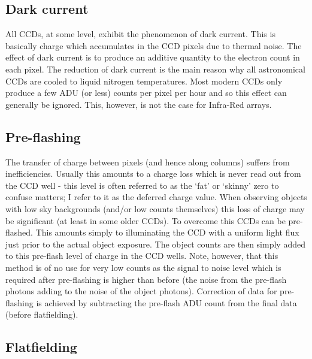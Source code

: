\subsection{Dark current}

All CCDs, at some level, exhibit the phenomenon of dark current. This is
basically charge which accumulates in the CCD pixels due to thermal
noise. The effect of dark current is to produce an additive quantity to
the electron count in each pixel. The reduction of dark current is the
main reason why all astronomical CCDs are cooled to liquid nitrogen
temperatures. Most modern CCDs only produce a few ADU (or less) counts
per pixel per hour and so this effect can generally be ignored. This,
however, is not the case for Infra-Red arrays.

\subsection{Pre-flashing}

The transfer of charge between pixels (and hence along columns) suffers
from inefficiencies. Usually this amounts to a charge loss which is
never read out from the CCD well - this level is often referred to as
the `fat' or `skinny' zero to confuse matters; I refer to it as the
deferred charge value. When observing objects with low sky backgrounds
(and/or low counts themselves) this loss of charge may be significant
(at least in some older CCDs). To overcome this CCDs can be pre-flashed.
This amounts simply to illuminating the CCD with a uniform light flux
just prior to the actual object exposure. The object counts are then
simply added to this pre-flash level of charge in the CCD wells. Note,
however, that this method is of no use for very low counts as the signal
to noise level which is required after pre-flashing is higher than
before (the noise from the pre-flash photons adding to the noise of the
object photons). Correction of data for pre-flashing is achieved by
subtracting the pre-flash ADU count from the final data (before
flatfielding).

\subsection{Flatfielding}

